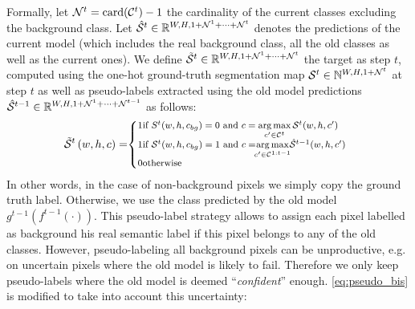 Formally, let $\mathcal{N}^t=\operatorname{card}(\mathcal{C}^{t})-1$ the cardinality of the current classes
excluding the background class. Let $\hat{\mathcal{S}}^{t} \in \mathbb{R}^{W,H,1+\mathcal{N}^1 +\dots + \mathcal{N}^t}$
denotes the predictions of the current model (which includes the real background class, all the old
classes as well as the current ones). We define $\tilde{\mathcal{S}}^{t} \in \mathbb{R}^{W,H,1+\mathcal{N}^1
        +\dots + \mathcal{N}^t}$ the target as step $t$, computed using the one-hot ground-truth segmentation map
$\mathcal{S}^{t} \in \mathbb{N}^{W,H,1+\mathcal{N}^t}$ at step $t$ as well as pseudo-labels extracted using the
old model predictions $\hat{\mathcal{S}}^{t-1} \in \mathbb{R}^{W,H,1+\mathcal{N}^1 +\dots + \mathcal{N}^{t-1}}$ as
follows:
%
\begin{equation}
    \footnotesize
    \tilde \mcS^{t}\left(w,h,c\right)= \mkern-5mu \left\{\begin{array}{ll}
        \mkern-10mu 1 \mkern-27mu & \text { if } S^{t} (w,h,c_{bg})=0 \text { and } c = \argmax \limits_{c' \in \mcC^{t}} \mcS^{t}(w,h,c')                                     \\
        \mkern-10mu 1 \mkern-27mu & \text { if } \mcS^{t}(w,h,c_{bg})=1 \text { and } c = \mkern-8mu \argmax \limits_{c' \in \mcC^{1:t-1}} \mkern-6mu \hat{\mcS}^{t-1}(w,h,c') \\
        \mkern-10mu 0 \mkern-27mu & \text { otherwise }                                                                                                                        \\
    \end{array}\right.
    \label{eq:pseudo_bis}
\end{equation}
%
In other words, in the case of non-background pixels we simply copy the ground truth label.
Otherwise, we use the class predicted by the old model $g^{t-1}(f^{t-1}(\cdot))$. This pseudo-label
strategy allows to assign each pixel labelled as background his real semantic label if this pixel
belongs to any of the old classes. However, pseudo-labeling all background pixels can be
unproductive, e.g. on uncertain pixels where the old model is likely to fail. Therefore we only keep
pseudo-labels where the old model is deemed ``\textit{confident}'' enough. \autoref{eq:pseudo_bis}
is modified to take into account this uncertainty:
%
